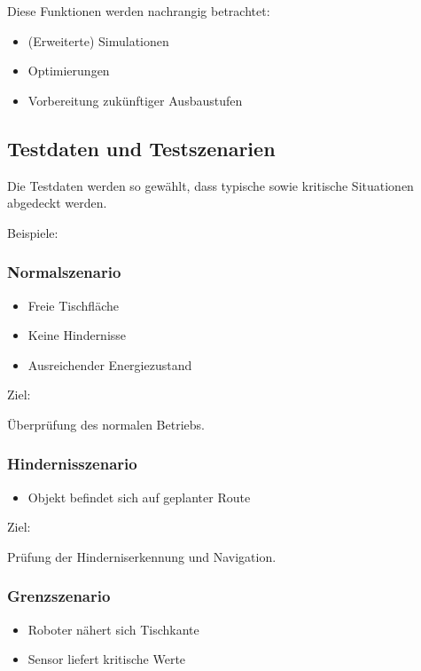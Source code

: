 \documentclass[
  a4paper,
  12pt,
  DIV=12,        %
  parskip=half,  %
  headings=small %
]{scrartcl}
\theoremstyle{definition}
\providecommand{\tightlist}{%
  \setlength{\itemsep}{0pt}\setlength{\parskip}{0pt}}
\theoremstyle{definition}
\begin{document}
Diese Funktionen werden nachrangig betrachtet:

\begin{itemize}
\tightlist
\item
  (Erweiterte) Simulationen
\item
  Optimierungen
\item
  Vorbereitung zukünftiger Ausbaustufen
\end{itemize}

\subsection{Testdaten und
Testszenarien}\label{testdaten-und-testszenarien}

Die Testdaten werden so gewählt, dass typische sowie kritische
Situationen abgedeckt werden.

Beispiele:

\subsubsection{Normalszenario}\label{normalszenario}

\begin{itemize}
\tightlist
\item
  Freie Tischfläche
\item
  Keine Hindernisse
\item
  Ausreichender Energiezustand
\end{itemize}

Ziel:

Überprüfung des normalen Betriebs.

\subsubsection{Hindernisszenario}\label{hindernisszenario}

\begin{itemize}
\tightlist
\item
  Objekt befindet sich auf geplanter Route
\end{itemize}

Ziel:

Prüfung der Hinderniserkennung und Navigation.

\subsubsection{Grenzszenario}\label{grenzszenario}

\begin{itemize}
\tightlist
\item
  Roboter nähert sich Tischkante
\item
  Sensor liefert kritische Werte
\end{itemize}
\end{document}
